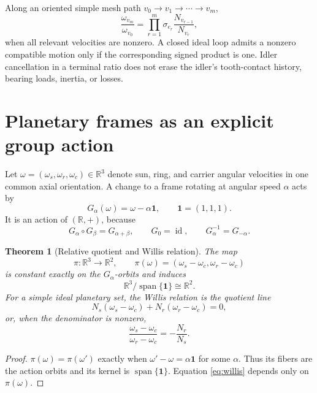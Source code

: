 \documentclass[11pt,a4paper]{article}
\theoremstyle{definition}
\theoremstyle{plain}
\newtheorem{theorem}[definition]{Theorem}
\theoremstyle{remark}
\newcommand{\R}{\mathbb{R}}
\newcommand{\one}{\bm 1}
\begin{document}
Along an oriented simple mesh path
\(v_0\to v_1\to\cdots\to v_m\),
\begin{equation}\label{eq:path-ratio}
\frac{\omega_{v_m}}{\omega_{v_0}}
=\prod_{r=1}^{m}
\sigma_{e_r}\frac{N_{v_{r-1}}}{N_{v_r}},
\end{equation}
when all relevant velocities are nonzero. A closed ideal loop admits
a nonzero compatible motion only if the corresponding signed product
is one. Idler cancellation in a terminal ratio does not erase the
idler's tooth-contact history, bearing loads, inertia, or losses.

\section{Planetary frames as an explicit group action}

Let
\(\omega=(\omega_s,\omega_r,\omega_c)\in\R^3\) denote sun, ring, and
carrier angular velocities in one common axial orientation. A change
to a frame rotating at angular speed \(\alpha\) acts by
\begin{equation}\label{eq:frame-action}
G_\alpha(\omega)=\omega-\alpha\one,\qquad
\one=(1,1,1).
\end{equation}
It is an action of \((\R,+)\), because
\[
G_\alpha\circ G_\beta=G_{\alpha+\beta},\qquad
G_0=\operatorname{id},\qquad
G_\alpha^{-1}=G_{-\alpha}.
\]

\begin{theorem}[Relative quotient and Willis relation]
\label{thm:willis-quotient}
The map
\[
\pi:\R^3\longrightarrow\R^2,\qquad
\pi(\omega)
=(\omega_s-\omega_c,\omega_r-\omega_c)
\]
is constant exactly on the \(G_\alpha\)-orbits and induces
\[
\R^3/\operatorname{span}\{\one\}\cong\R^2.
\]
For a simple ideal planetary set, the Willis relation is the quotient
line
\begin{equation}\label{eq:willis}
N_s(\omega_s-\omega_c)
+N_r(\omega_r-\omega_c)=0,
\end{equation}
or, when the denominator is nonzero,
\[
\frac{\omega_s-\omega_c}{\omega_r-\omega_c}
=-\frac{N_r}{N_s}.
\]
\end{theorem}

\begin{proof}
\(\pi(\omega)=\pi(\omega')\) exactly when
\(\omega'-\omega=\alpha\one\) for some \(\alpha\). Thus its fibers are
the action orbits and its kernel is
\(\operatorname{span}\{\one\}\). Equation \cref{eq:willis} depends
only on \(\pi(\omega)\).
\end{proof}
\end{document}
